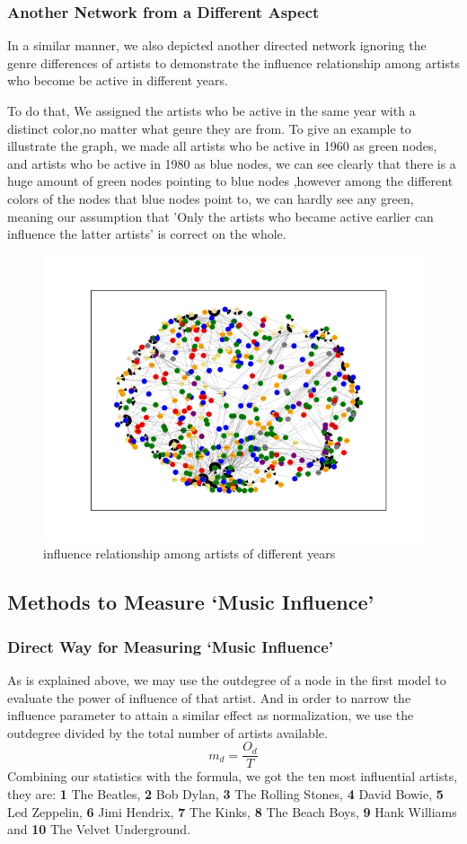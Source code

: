 \documentclass[12pt]{article}
\begin{document}
\subsubsection{Another Network from a Different Aspect}\quad \;
In a similar manner, we also depicted another directed network ignoring the genre differences of artists to demonstrate the influence relationship among artists who become be active in different years.

To do that, We assigned the artists who be active in the same year with a distinct color,no matter what genre they are from. To give an example to illustrate the graph, we made all artists who be active in 1960 as green nodes, and artists who be active in 1980 as blue nodes, we can see clearly that there is a huge amount of green nodes pointing to blue nodes ,however among the different colors of the nodes that blue nodes point to, we can hardly see any green, meaning our assumption that 'Only the artists who became active earlier can influence the latter artists' is correct on the whole. 
\begin{figure}[h]
\small
\centering
\includegraphics[width=14cm]{Figure_3.png}
\caption{influence relationship among artists of different years}
\end{figure}
\subsection{Methods to Measure `Music Influence'}
\subsubsection{Direct Way for Measuring `Music Influence'}\quad \;
As is explained above, we may use the outdegree of a node in the first model to evaluate the power of influence of that artist.
And in order to narrow the influence parameter to attain a similar effect as normalization, we use the outdegree divided by the total number of artists available. 
\[{m_d} = \frac{O_d}{T}\]\quad\;
Combining our statistics with the formula, we got the ten most influential artists, they are: \textbf{1} The Beatles, \textbf{2} Bob Dylan, \textbf{3} The Rolling Stones, \textbf{4} David Bowie, \textbf{5} Led Zeppelin, \textbf{6} Jimi Hendrix, \textbf{7} The Kinks, \textbf{8} The Beach Boys, \textbf{9} Hank Williams and \textbf{10} The Velvet Underground.
\end{document}
